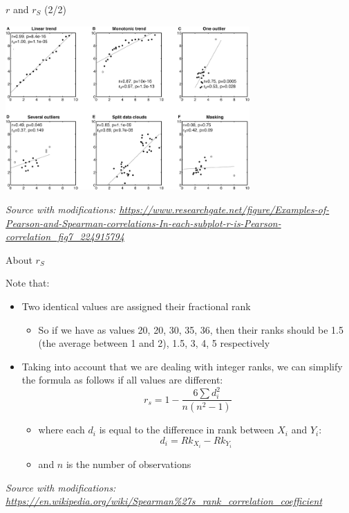 \documentclass{beamer}
\begin{document}
\begin{frame}
{\centerline{$r$ and $r_S$ (2/2)}}

\begin{center}
\includegraphics[width=0.7\textwidth]{A2022.IDSEPC.Correlazione/Examples-of-Pearson-and-Spearman-correlations-In-each-subplot-r-is-Pearson-correlation.jpeg}
\end{center} 

\textit{\tiny
\vspace{-\baselineskip}
Source with modifications: \url{https://www.researchgate.net/figure/Examples-of-Pearson-and-Spearman-correlations-In-each-subplot-r-is-Pearson-correlation_fig7_224915794}}

\end{frame}

\begin{frame}
{\centerline{About $r_S$}}
Note that:
\begin{itemize}
   \item Two identical values are assigned their fractional rank
   \begin{itemize}
   \item So if we have as values 20, 20, 30, 35, 36, then their ranks should be 1.5 (the average between 1 and 2), 1.5, 3, 4, 5 respectively
\end{itemize}
   \item Taking into account that we are dealing with integer ranks, we can simplify the formula as follows if all values are different:
   $$ r_{s}={1-{\frac {6\sum d_{i}^{2}}{n(n^{2}-1)}}}$$
   \begin{itemize}
   \item where each $d_i$ is equal to the difference in rank between $X_i$ and $Y_i$:
   $$d_i = Rk_{X_i} - Rk_{Y_i}$$
   \item and $n$ is the number of observations
\end{itemize}
\end{itemize}

\textit{\tiny
\vspace{-\baselineskip}
Source with modifications: \url{https://en.wikipedia.org/wiki/Spearman\%27s_rank_correlation_coefficient}}

\end{frame}
\end{document}
